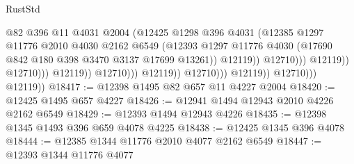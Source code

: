 \begin{lexlean}{RustStd}
\begin{coremodule}
                                                      @82
                                                      @396
                                                      @11
                                                      @4031
                                                      @2004
                                                      (@12425
                                                        @1298
                                                        @396
                                                        @4031
                                                        (@12385
                                                          @1297
                                                          @11776
                                                          @2010
                                                          @4030
                                                          @2162
                                                          @6549
                                                          (@12393
                                                            @1297
                                                            @11776
                                                            @4030
                                                            (@17690
                                                              @842
                                                              @180
                                                              @398
                                                              @3470
                                                              @3137
                                                              @17699
                                                              @13261))
                                                          @12119))
                                                      @12710)))
                                                @12119))
                                            @12710)))
                                      @12119))
                                  @12710)))
                            @12119))
                        @12710)))
                  @12119))
              @12710)))
        @12119))
@18417 := @12398 @1495 @82 @657 @11 @4227 @2004
@18420 := @12425 @1495 @657 @4227
@18426 := @12941 @1494 @12943 @2010 @4226 @2162 @6549
@18429 := @12393 @1494 @12943 @4226
@18435 := @12398 @1345 @1493 @396 @659 @4078 @4225
@18438 := @12425 @1345 @396 @4078
@18444 := @12385 @1344 @11776 @2010 @4077 @2162 @6549
@18447 := @12393 @1344 @11776 @4077

\end{coremodule}
\end{lexlean}
